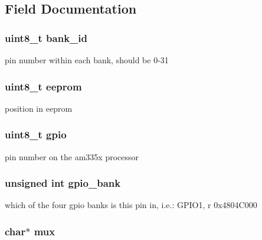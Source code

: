 \subsection{Field Documentation}
\hypertarget{structs___p_i_n_a9ef376f6d84af9699e87709d7662cf74}{
\subsubsection[{bank\-\_\-id}]{\setlength{\rightskip}{0pt plus 5cm}uint8\-\_\-t bank\-\_\-id}}\label{structs___p_i_n_a9ef376f6d84af9699e87709d7662cf74}
pin number within each bank, should be 0-\/31 \hypertarget{structs___p_i_n_a7589e79ff8d69f5bff025fe44090cc6a}{
\subsubsection[{eeprom}]{\setlength{\rightskip}{0pt plus 5cm}uint8\-\_\-t eeprom}}\label{structs___p_i_n_a7589e79ff8d69f5bff025fe44090cc6a}
position in eeprom \hypertarget{structs___p_i_n_a80b2e88e969b3ee6cde0d4380eadc5dd}{
\subsubsection[{gpio}]{\setlength{\rightskip}{0pt plus 5cm}uint8\-\_\-t gpio}}\label{structs___p_i_n_a80b2e88e969b3ee6cde0d4380eadc5dd}
pin number on the am335x processor \hypertarget{structs___p_i_n_a51c31aad6d06ea919700fb1a180688bd}{
\subsubsection[{gpio\-\_\-bank}]{\setlength{\rightskip}{0pt plus 5cm}unsigned int gpio\-\_\-bank}}\label{structs___p_i_n_a51c31aad6d06ea919700fb1a180688bd}
which of the four gpio banks is this pin in, i.\-e.\-: G\-P\-I\-O1, r 0x4804\-C000 \hypertarget{structs___p_i_n_a268ae5ca019047bc0bc32f45f6e4c8a0}{
\subsubsection[{mux}]{\setlength{\rightskip}{0pt plus 5cm}char$\ast$ mux}}\label{structs___p_i_n_a268ae5ca019047bc0bc32f45f6e4c8a0}
